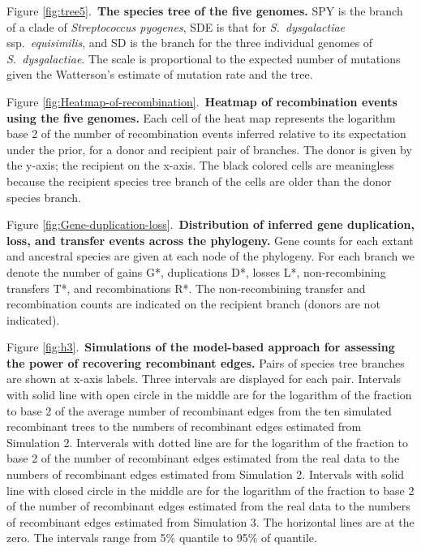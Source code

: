 \documentclass[10pt]{article}
\begin{document}
\begin{flushleft}

Figure \ref{fig:tree5}.\ {\bf The species tree of the five genomes.}
SPY is the branch of a clade of \textit{Streptococcus
pyogenes}, SDE is that for \textit{S.\ dysgalactiae} ssp.\textit{\ equisimilis},
and SD is the branch for the three individual genomes of \textit{S.\
dysgalactiae}. The scale is proportional to the expected number of mutations
given the Watterson's estimate of mutation rate and the tree.

Figure \ref{fig:Heatmap-of-recombination}.\ {\bf Heatmap of recombination events 
using the five genomes.}
Each cell of the heat map represents the logarithm base
2 of the number of recombination events inferred relative to its expectation
under the prior, for a donor and recipient pair of branches. The donor is given by
the y-axis; the recipient on the x-axis.  The black colored cells are meaningless
because the recipient species tree branch of the cells are older than the donor
species branch.

Figure \ref{fig:Gene-duplication-loss}.\ {\bf Distribution of inferred gene 
duplication, loss, and transfer events across
the phylogeny.}  Gene counts for
each extant and ancestral species are given at each node of the phylogeny.  For
each branch we denote the number of gains G*, duplications D*, losses L*,
non-recombining transfers T*, and recombinations R*.  The non-recombining
transfer and recombination counts are indicated on the recipient branch (donors
are not indicated).

Figure \ref{fig:h3}.\ {\bf Simulations of the model-based approach for assessing 
the power of recovering recombinant edges.} 
Pairs of species tree branches are shown at x-axis labels.
Three intervals are displayed for each pair. Intervals with solid line with open
circle in the middle are for the logarithm of the fraction to base 2 of the average
number of recombinant edges from the ten simulated recombinant trees 
to the numbers of recombinant edges estimated from Simulation 2. 
Interverals with dotted line are for the logarithm of the fraction to base 2 of
the number of recombinant edges estimated from the real data
to the numbers of recombinant edges estimated from Simulation 2.
Intervals with solid line with closed circle in the middle are for the logarithm
of the fraction to base 2 of the number of recombinant edges estimated from the real data
to the numbers of recombinant edges estimated from Simulation 3. 
The horizontal lines are at the zero.
The intervals range from 5\% quantile to 95\% of quantile.

\end{flushleft}
\clearpage{}
\end{document}
